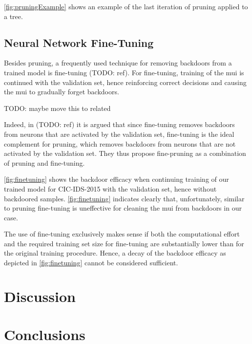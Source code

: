 \documentclass[10pt,sigconf,letterpaper,dvipsnames]{acmart}
\newcommand\note[2]{{\color{#1}#2}}
\newcommand\todo[1]{{\note{red}{TODO: #1}}}
\begin{document}
\autoref{fig:pruningExample} shows an example of the last iteration of pruning applied to a tree.

\subsection{Neural Network Fine-Tuning}
Besides pruning, a frequently used technique for removing backdoors from a trained model is fine-tuning (\todo{ref}). For fine-tuning, training of the \gls{mui} is continued with the validation set, hence reinforcing correct decisions and causing the \gls{mui} to gradually forget backdoors.

\todo{maybe move this to related}

Indeed, in (\todo{ref}) it is argued that since fine-tuning removes backdoors from neurons that are activated by the validation set, fine-tuning is the ideal complement for pruning, which removes backdoors from neurons that are not activated by the validation set. They thus propose fine-pruning as a combination of pruning and fine-tuning.

\autoref{fig:finetuning} shows the backdoor efficacy when continuing training of our trained model for CIC-IDS-2015 with the validation set, hence without backdoored samples. 
\autoref{fig:finetuning} indicates clearly that, unfortunately, similar to pruning fine-tuning is uneffective for cleaning the \gls{mui} from backdoors in our case. 

The use of fine-tuning exclusively makes  sense if both the computational effort and the required training set size for fine-tuning are substantially lower than for the original training procedure. Hence, a decay of the backdoor efficacy as depicted in \autoref{fig:finetuning} cannot be considered sufficient.

\section{Discussion}


\section{Conclusions}
\end{document}
